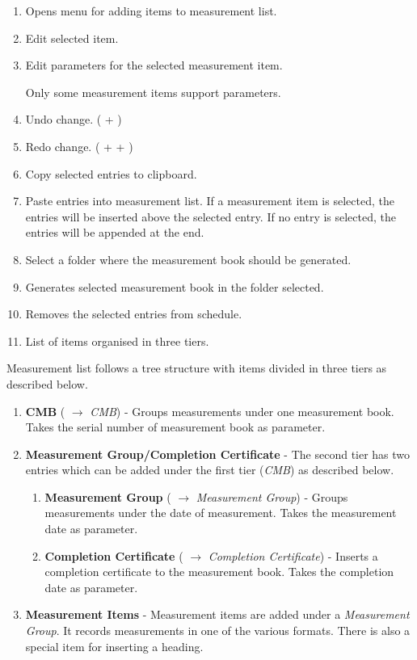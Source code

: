 \documentclass[twoside,a4paper]{refart}
\newenvironment{noteblock}[1]%
{\begin{mdframed}[topline=false,bottomline=false, rightline=false,
		linewidth=2pt, frametitle={#1}]}%
		{\end{mdframed}}
\begin{document}
	 \begin{enumerate}
	 	\item Opens menu for adding items to measurement list.
	 	\item Edit selected item.
	 	\item Edit parameters for the selected measurement item. \\
	 	\begin{noteblock}{Note:}
	 		Only some measurement items support parameters.
	 	\end{noteblock}
	 	\item Undo change. ( + )
	 	\item Redo change. ( +  + )	 
	 	\item Copy selected entries to clipboard.
	 	\item Paste entries into measurement list. If a measurement item is selected, the entries will be inserted above the selected entry. If no entry is selected, the entries will be appended at the end.
	 	\item Select a folder where the measurement book should be generated.
	 	\item Generates selected measurement book in the folder selected.
	 	\item Removes the selected entries from schedule.
	 	\item List of items organised in three tiers.
	 \end{enumerate}
	 
	 Measurement list follows a tree structure with items divided in three tiers as described below.
	 
	 \begin{enumerate}
	 	\item \textbf{CMB} (\fbox{\emph{$+$}} $\rightarrow$ \emph{CMB}) - Groups measurements under one measurement book. Takes the serial number of measurement book as parameter.
	 	\item \textbf{Measurement Group/Completion Certificate} - The second tier has two entries which can be added under the first tier (\emph{CMB}) as described below.
	 	\begin{enumerate}
	 		\item \textbf{Measurement Group} (\fbox{\emph{$+$}} $\rightarrow$ \emph{Measurement Group}) - Groups measurements under the date of measurement. Takes the measurement date as parameter.
	 		\item \textbf{Completion Certificate} (\fbox{\emph{$+$}} $\rightarrow$ \emph{Completion Certificate}) - Inserts a completion certificate to the measurement book. Takes the completion date as parameter.
	 	\end{enumerate}
	 	\item \textbf{Measurement Items} - Measurement items are added under a \emph{Measurement Group}. It records  measurements in one of the various formats. There is also a special item for inserting a heading.
	 \end{enumerate}
	 
\end{document}
